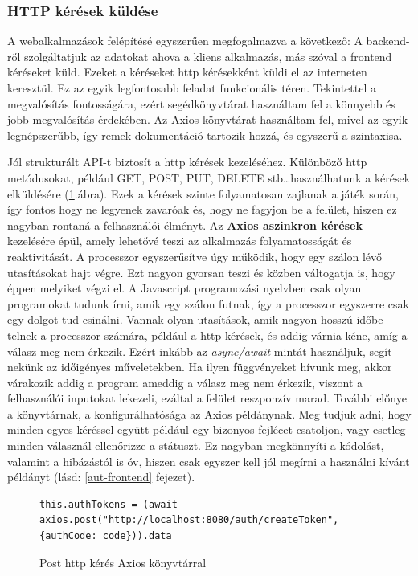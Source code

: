 \documentclass[a4paper,twoside]{article}
\begin{document}
\subsubsection{HTTP kérések küldése}\label{axios-tech}
A webalkalmazások felépítésé egyszerűen megfogalmazva a következő: A backend-ről szolgáltatjuk az adatokat ahova a kliens alkalmazás, más szóval a frontend kéréseket küld. Ezeket a kéréseket http kérésekként küldi el az interneten keresztül. Ez az egyik legfontosabb feladat funkcionális téren. Tekintettel a megvalósítás fontosságára, ezért segédkönyvtárat használtam fel a könnyebb és jobb megvalósítás érdekében. Az Axios\cite{axiosLibrary} könyvtárat használtam fel, mivel az egyik legnépszerűbb, így remek dokumentáció tartozik hozzá, és egyszerű a szintaxisa. 

Jól strukturált API-t biztosít a http kérések kezeléséhez. Különböző http metódusokat, például GET, POST,
PUT, DELETE stb\ldots használhatunk a kérések elküldésére (\ref{axios}.ábra). Ezek a kérések szinte folyamatosan zajlanak a játék során, így fontos hogy ne legyenek zavaróak és, hogy ne fagyjon be a felület, hiszen ez nagyban rontaná a felhasználói élményt. Az \textbf{Axios aszinkron kérések} kezelésére épül, amely
lehetővé teszi az alkalmazás folyamatosságát és reaktivitását. A processzor egyszerűsítve úgy működik, hogy egy szálon lévő utasításokat hajt végre. Ezt nagyon gyorsan teszi és közben váltogatja is, hogy éppen melyiket végzi el. A Javascript programozási nyelvben csak olyan programokat tudunk írni, amik egy szálon futnak, így a processzor egyszerre csak egy dolgot tud csinálni. Vannak olyan utasítások, amik nagyon hosszú időbe telnek a processzor számára, például a http kérések, és addig várnia kéne, amíg a válasz meg nem érkezik. Ezért inkább az \textit{async/await} mintát használjuk, segít nekünk az időigényes műveletekben. Ha ilyen függvényeket hívunk meg, akkor várakozik addig a program ameddig a válasz meg nem érkezik, viszont a felhasználói inputokat lekezeli, ezáltal a felület reszponzív marad.
További előnye a könyvtárnak, a konfigurálhatósága az Axios példánynak. Meg tudjuk adni, hogy minden egyes kéréssel együtt például egy bizonyos fejlécet csatoljon, vagy esetleg minden válasznál ellenőrizze a státuszt. Ez nagyban megkönnyíti a kódolást, valamint a hibázástól is óv, hiszen csak egyszer kell jól megírni a használni kívánt példányt (lásd: \ref{aut-frontend} fejezet).	
\begin{figure}
	\caption{Post http kérés Axios könyvtárral}
	
		\begin{minipage}{\textwidth}
			\begin{lstlisting}[style=javascriptStyle]
					this.authTokens = (await axios.post("http://localhost:8080/auth/createToken", {authCode: code})).data
					\end{lstlisting}
				\end{minipage}
	
\label{axios}
\end{figure}
\end{document}
